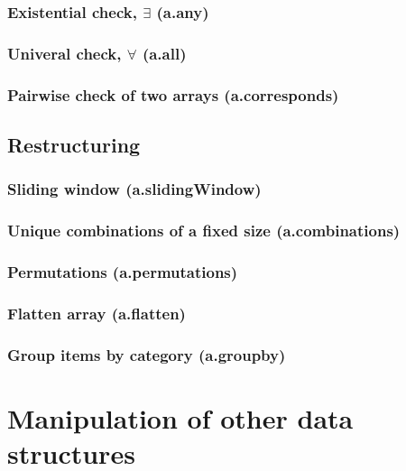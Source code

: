 \documentclass{article}
\theoremstyle{definition}
\begin{document}
\subsubsection{Existential check, $\exists$ (a.any)}

\subsubsection{Univeral check, $\forall$ (a.all)}

\subsubsection{Pairwise check of two arrays (a.corresponds)}

\subsection{Restructuring}

\subsubsection{Sliding window (a.slidingWindow)}

\subsubsection{Unique combinations of a fixed size (a.combinations)}

\subsubsection{Permutations (a.permutations)}

\subsubsection{Flatten array (a.flatten)}

\subsubsection{Group items by category (a.groupby)}

\pagebreak

\section{Manipulation of other data structures}
\end{document}
